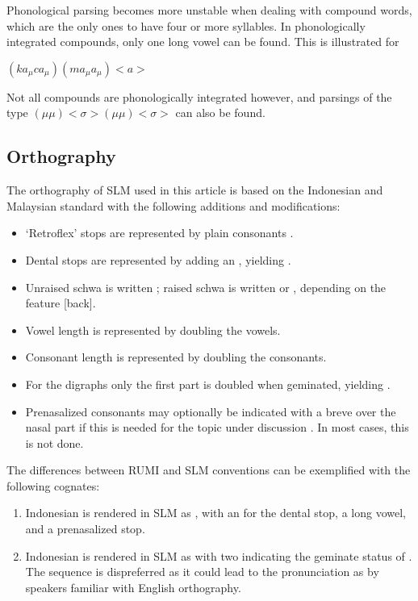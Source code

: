 Phonological parsing becomes more unstable when dealing with compound words, which are the only ones to have four or more syllables. In phonologically integrated compounds, only one long vowel can be found. This is illustrated for 

\ea$(ka_{\mu}ca_{\mu})(ma_{\mu}a_{\mu})<$\dentt{}$a>$\z

Not all compounds are phonologically integrated however, and parsings of the type $(\mu\mu)<\sigma>(\mu\mu)<\sigma>$ can also be found.


\subsection{Orthography}
The orthography of SLM used in this article is based on the Indonesian and Malaysian standard with the following additions and modifications:
\begin{itemize}
 \item `Retroflex' stops are represented by plain consonants .
 \item Dental stops are represented by adding an , yielding .
 \item Unraised schwa is written ; raised schwa is written  or , depending on the feature [back].
 \item Vowel length is represented by doubling the vowels. 
 \item Consonant length is represented by doubling the consonants.
 \item For the digraphs  only the first part is doubled when geminated, yielding .
 \item Prenasalized consonants may optionally be indicated with a breve over the nasal part if this is needed for the topic under discussion \graphem{\umb, \und, \unJ, \ung}. In most cases, this is not done.
\end{itemize}

The differences between RUMI and SLM conventions can be exemplified with the following cognates:

\begin{enumerate}
 \item Indonesian  is rendered in SLM as , with an  for the dental stop, a long vowel, and a prenasalized stop.
 \item Indonesian  is rendered in SLM as  with two  indicating the geminate status of \phonem{\ny}. The sequence  is dispreferred as it could lead to the pronunciation as  by speakers familiar with English orthography.
\end{enumerate}


